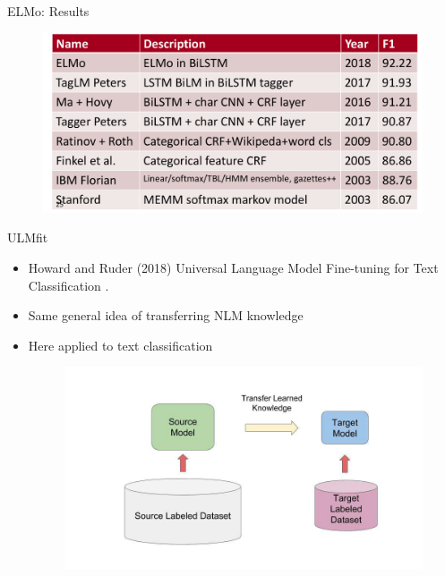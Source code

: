 \documentclass[handout]{beamer}
\begin{document}
\begin{frame}{ELMo: Results}

    \begin{figure}[h]
        	\includegraphics[scale = 0.25]{pics/elmo_results.png}
        \end{figure}  

 


\end{frame}


\begin{frame}{ULMfit}
\begin{scriptsize}
\begin{itemize}
\item Howard and Ruder (2018) Universal Language Model Fine-tuning for Text Classification \cite{howard-ruder-2018-universal}. 
\item Same general idea of transferring NLM knowledge
\item  Here applied to text classification

\begin{figure}[h]
        	\includegraphics[scale = 0.29]{pics/ulmfit1.png}
        \end{figure}  

\end{itemize}
\end{scriptsize}
\end{frame}
\end{document}
